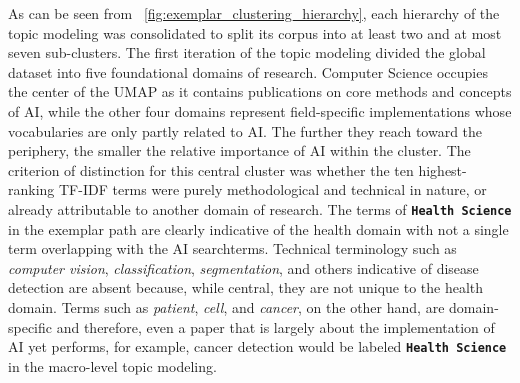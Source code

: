 \documentclass{article}
\begin{document}
	As can be seen from \figurename~\ref{fig:exemplar_clustering_hierarchy}, each hierarchy of the topic modeling was consolidated to split its corpus into at least two and at most seven sub-clusters. The first iteration of the topic modeling divided the global dataset into five foundational domains of research. Computer Science occupies the center of the UMAP as it contains publications on core methods and concepts of AI, while the other four domains represent field-specific implementations whose vocabularies are only partly related to AI. The further they reach toward the periphery, the smaller the relative importance of AI within the cluster. The criterion of distinction for this central cluster was whether the ten highest-ranking TF-IDF terms were purely methodological and technical in nature, or already attributable to another domain of research. The terms of \texttt{\textbf{Health Science}}  in the exemplar path are clearly indicative of the health domain with not a single term overlapping with the AI searchterms. Technical terminology such as \textit{computer vision}, \textit{classification}, \textit{segmentation}, and others indicative of disease detection are absent because, while central, they are not unique to the health domain. Terms such as \textit{patient}, \textit{cell}, and \textit{cancer}, on the other hand, are domain-specific and therefore, even a paper that is largely about the implementation of AI yet performs, for example, cancer detection would be labeled \textbf{\texttt{Health Science}}  in the macro-level topic modeling.
	
\end{document}
